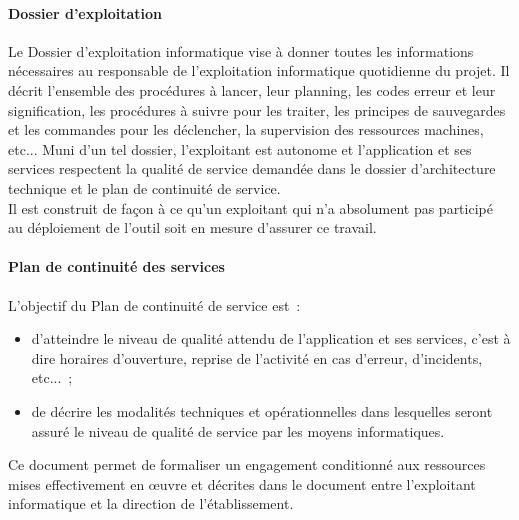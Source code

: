 \paragraph{Dossier d'exploitation}
Le Dossier d'exploitation informatique vise à donner toutes les informations nécessaires au responsable de l'exploitation informatique quotidienne du projet. Il décrit l'ensemble des procédures à lancer, leur planning, les codes erreur et leur signification, les procédures à suivre pour les traiter, les principes de sauvegardes et les commandes pour les déclencher, la supervision des ressources machines, etc... Muni d'un tel dossier, l'exploitant est autonome et l'application et ses services respectent la qualité de service demandée dans le dossier d'architecture technique et le plan de continuité de service.
\\
Il est construit de façon à ce qu'un exploitant qui n'a absolument pas participé au déploiement de l'outil soit en mesure d'assurer ce travail.

\paragraph{Plan de continuité des services}
L'objectif du Plan de continuité de service est~:
\begin{itemize}
	\item d'atteindre le niveau de qualité attendu de l'application et ses services, c'est à dire horaires d'ouverture, reprise de l'activité en cas d'erreur, d'incidents, etc...~;
	\item de décrire les modalités techniques et opérationnelles dans lesquelles seront assuré le niveau de qualité de service par les moyens informatiques.
\end{itemize}
Ce document permet de formaliser un engagement conditionné aux ressources mises effectivement en œuvre et décrites dans le document entre l'exploitant informatique et la direction de l'établissement.

